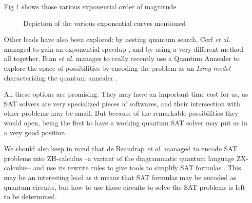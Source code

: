 \documentclass{article}
\begin{document}
Fig \ref{fig:exp} shows those various exponential order of magnitude 

\begin{figure}
\caption{Depiction of the various exponential curves mentioned}
\label{fig:exp}
\end{figure}  

Other leads have also been explored: by nesting quantum search, Cerf \emph{et
al.} managed to gain an exponential speedup \cite{CGW00}, and by using a very
different method all together, Bian \emph{et al.} manages to really recently use
a Quantum Annealer to explore the space of possibilities by encoding the problem
as an \emph{Izing model} characterizing the quantum annealer \cite{BCM+20}.

All these options are promising. They may have an important time cost for us, as
SAT solvers are very specialized pieces of softwares, and their intersection
with other problems may be small. But because of the remarkable possibilities
they would open, being the first to have a working quantum SAT solver may put us
in a very good position.

We should also keep in mind that de Beaudrap \emph{et al.} managed to encode SAT
problems into ZH-calculus --a variant of the diagrammatic quantum language
ZX-calculus-- and use its rewrite rules to give tools to simplify SAT formulas
\cite{dKM21}. This may be an interesting lead as it means that SAT formulas may
be encoded as quantum circuits, but how to use those circuits to solve the SAT
problems is left to be determined.



\end{document}

